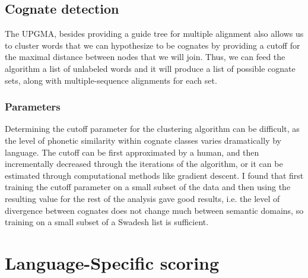 \documentclass[doc,natbib,11pt]{apa6}
\begin{document}
\subsection{Cognate detection}

The UPGMA, besides providing a guide tree for multiple alignment also allows us to cluster words that we can hypothesize to be cognates by providing a cutoff for the maximal distance between nodes that we will join. Thus, we can feed the algorithm a list of unlabeled words and it will produce a list of possible cognate sets, along with multiple-sequence alignments for each set.  



\subsubsection{Parameters}
Determining the cutoff parameter for the clustering algorithm can be difficult, as the level of phonetic similarity within cognate classes varies dramatically by language. The cutoff can be first approximated by a human, and then incrementally decreased through the iterations of the algorithm, or it can be estimated through computational methods like gradient descent. I found that first training the cutoff parameter on a small subset of the data and then using the resulting value for the rest of the analysis gave good results, i.e. the level of divergence between cognates does not change much between semantic domains, so training on a small subset of a Swadesh list is sufficient. 


\section{Language-Specific scoring}
\end{document}
